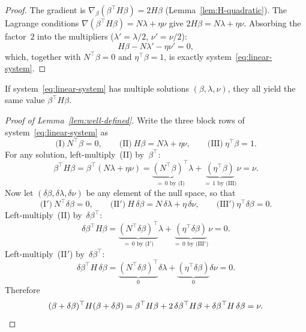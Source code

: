 \begin{proof}
The gradient is
$\nabla_{\beta}
  (\beta^\top H \beta) = 2H \beta$
(Lemma~\ref{lem:H-quadratic}).
The Lagrange conditions
$\nabla(\beta^\top H \beta)
= N\lambda + \eta\nu$
give
$2H\beta = N\lambda + \eta\nu$.
Absorbing the factor~$2$ into the multipliers
($\lambda' = \lambda/2$, $\nu' = \nu/2$):
\[
  H \beta - N \lambda' - \eta \nu' = 0,
\]
which, together with $N^\top \beta = 0$ and
$\eta^\top \beta = 1$, is exactly
system~\eqref{eq:linear-system}.
\end{proof}

\medskip

\begin{lemma*}
If system~\eqref{eq:linear-system} has multiple solutions
$(\beta, \lambda, \nu)$, they all yield the same value
$\beta^\top H \beta$.
\end{lemma*}

\begin{proof}[Proof of Lemma~\ref{lem:well-defined}]
Write the three block rows of system~\eqref{eq:linear-system} as
\[
  \text{(I)}\ N^\top \beta = 0, \qquad
  \text{(II)}\ H\beta = N\lambda + \eta\nu, \qquad
  \text{(III)}\ \eta^\top \beta = 1.
\]
For any solution, left-multiply~(II) by~$\beta^\top$:
\[
  \beta^\top H\beta
  = \beta^\top(N\lambda + \eta\nu)
  = \underbrace{(N^\top\beta)^\top}_{=\,0\text{ by (I)}}\lambda
    + \underbrace{(\eta^\top\beta)}_{=\,1\text{ by (III)}}\nu
  = \nu.
\]
Now let $(\delta\beta, \delta\lambda, \delta\nu)$ be any element
of the null space, so that
\[
  \text{(I$'$)}\ N^\top\delta\beta = 0, \qquad
  \text{(II$'$)}\ H\,\delta\beta = N\,\delta\lambda + \eta\,\delta\nu, \qquad
  \text{(III$'$)}\ \eta^\top\delta\beta = 0.
\]
Left-multiply~(II) by~$\delta\beta^\top$:
\[
  \delta\beta^\top H\beta
  = \underbrace{(N^\top\delta\beta)^\top}_{=\,0\text{ by (I$'$)}}\lambda
    + \underbrace{(\eta^\top\delta\beta)}_{=\,0\text{ by (III$'$)}}\nu
  = 0.
\]
Left-multiply~(II$'$) by~$\delta\beta^\top$:
\[
  \delta\beta^\top H\,\delta\beta
  = \underbrace{(N^\top\delta\beta)^\top}_{0}\delta\lambda
    + \underbrace{(\eta^\top\delta\beta)}_{0}\delta\nu
  = 0.
\]
Therefore
\[
  (\beta + \delta\beta)^\top H(\beta + \delta\beta)
  = \beta^\top H\beta
    + 2\,\delta\beta^\top H\beta
    + \delta\beta^\top H\,\delta\beta
  = \nu. \qedhere
\]
\end{proof}

